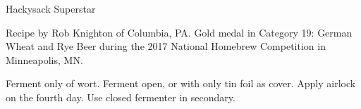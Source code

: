 \begin{recipe}{Hackysack Superstar}

\begin{aboutblock}
Recipe by Rob Knighton of Columbia, PA. Gold medal in Category 19: German
Wheat and Rye Beer during the 2017 National Homebrew Competition in Minneapolis,
MN. \sourceaha
\end{aboutblock}


\begin{methodandtiming}
 
\begin{mashsteps}
\end{mashsteps}

\begin{fermentationsteps}
\end{fermentationsteps}

\begin{directions}
Ferment only  of wort. Ferment open, or with only tin foil as
cover. Apply airlock on the fourth day. Use closed fermenter in secondary.
\end{directions}

\end{methodandtiming}

\recipebreak

\begin{ingredientsblock}

\begin{malts}
\end{malts}

\begin{hops}
\end{hops}


\begin{twists}
\end{twists}

\end{ingredientsblock}

\end{recipe}

